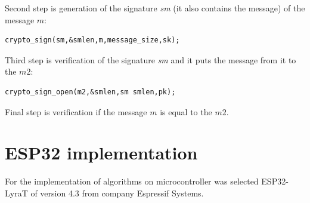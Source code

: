 \documentclass[thesis=M,english]{FITthesis}[2019/12/23]
\begin{document}
\bigskip
\noindent
Second step is generation of the signature \textit{sm} (it also contains the message) of the message $m$:
\begin{lstlisting}[frame=single]
crypto_sign(sm,&smlen,m,message_size,sk);
\end{lstlisting}

\bigskip
\noindent
Third step is verification of the signature \textit{sm} and it puts the message from it to the $m2$:
\begin{lstlisting}[frame=single]
crypto_sign_open(m2,&smlen,sm smlen,pk);
\end{lstlisting}

\bigskip
\noindent
Final step is verification if the message $m$ is equal to the $m2$.

\newpage
\section{ESP32 implementation} \label{ESP32_impl}
For the implementation of algorithms on microcontroller was selected ESP32-LyraT of version 4.3 from company Espressif Systems.
\end{document}
